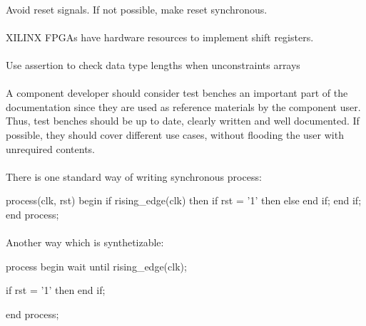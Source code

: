 \documentclass[12pt]{article}
\begin{document}
\paragraph{}
Avoid reset signals. If not possible, make reset synchronous.


\paragraph{}
XILINX FPGAs have hardware resources to implement shift registers.



\paragraph{}
Use assertion to check data type lengths when unconstraints
arrays



\paragraph{}
A component developer should consider test benches an important
part of the documentation since they are used as reference
materials by the component user. Thus, test benches should be up
to date, clearly written and well documented. If possible, they
should cover different use cases, without flooding the user with
unrequired contents.



\paragraph{}
There is one standard way of writing synchronous process:
\begin{vhdl}
process(clk, rst)
begin
 if rising_edge(clk) then
  if rst = '1' then
  else
  end if;
 end if;
end process;
\end{vhdl}

\paragraph{}
Another way which is synthetizable:
\begin{vhdl}
process
begin
 wait until rising_edge(clk);

 if rst = '1' then
 end if;

end process;
\end{vhdl}
\end{document}
